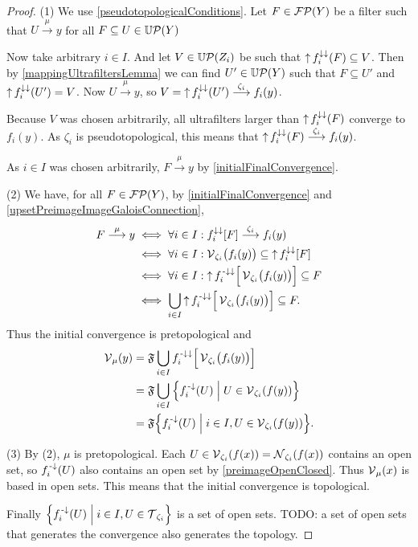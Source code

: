 \begin{proof}
(1) We use \ref{pseudotopologicalConditions}. Let $F\in\operatorname{\mathcal{FP}}(Y)$ be a filter such that $U\overset{\mu}{\longrightarrow} y$ for all $F\subseteq U\in\operatorname{\mathbb{U}\mathcal{P}}(Y)$ 

Now take arbitrary $i\in I$. And let $V\in\operatorname{\mathbb{U}\mathcal{P}}(Z_i)$ be such that $\operatorname{\uparrow} f_i^{\downarrow\downarrow}(F) \subseteq V$. Then by \ref{mappingUltrafiltersLemma} we can find $U'\in\operatorname{\mathbb{U}\mathcal{P}}(Y)$ such that $F\subseteq U'$ and $\operatorname{\uparrow} f_i^{\downarrow\downarrow}(U') = V$. Now $U\overset{\mu}{\longrightarrow} y$, so $V = \operatorname{\uparrow} f_i^{\downarrow\downarrow}(U') \overset{\zeta_i}{\longrightarrow} f_i(y)$. 

Because $V$ was chosen arbitrarily, all ultrafilters larger than $\operatorname{\uparrow} f_i^{\downarrow\downarrow}(F)$ converge to $f_i(y)$. As $\zeta_i$ is pseudotopological, this means that $\operatorname{\uparrow} f_i^{\downarrow\downarrow}(F) \overset{\zeta_i}{\longrightarrow} f_i(y)$.

As $i\in I$ was chosen arbitrarily, $F\overset{\mu}{\longrightarrow} y$ by \ref{initialFinalConvergence}.

(2) We have, for all $F\in \operatorname{\mathcal{FP}}(Y)$, by \ref{initialFinalConvergence} and \ref{upsetPreimageImageGaloisConnection},
\begin{align*}
F \overset{\mu}{\longrightarrow} y &\iff \forall i\in I: f_i^{\downarrow\downarrow}[F] \overset{\zeta_i}{\longrightarrow} f_i(y) \\
&\iff \forall i\in I: \operatorname{\mathcal{V}}_{\zeta_i}\!\big(f_i(y)\big) \subseteq \operatorname{\uparrow} f_i^{\downarrow\downarrow}[F] \\
&\iff \forall i\in I: \operatorname{\uparrow} f_i^{{\text{\hspace{0.15em}-}\downarrow}\downarrow}\Big[\operatorname{\mathcal{V}}_{\zeta_i}\!\big(f_i(y)\big)\Big] \subseteq F \\
&\iff \bigcup_{i\in I} \operatorname{\uparrow} f_i^{{\text{\hspace{0.15em}-}\downarrow}\downarrow}\Big[\operatorname{\mathcal{V}}_{\zeta_i}\!\big(f_i(y)\big)\Big] \subseteq F.
\end{align*}
Thus the initial convergence is pretopological and
\begin{align*}
\vicinities_\mu(y) &= \mathfrak{F}\bigcup_{i\in I} f_i^{\preimf\imf}\Big[\vicinities_{\zeta_i}\!\big(f_i(y)\big)\Big] \\
&= \mathfrak{F}\bigcup_{i\in I}\setbuilder{f_i^\preimf(U)}{U\in \vicinities_{\zeta_i}(f(y))} \\
&= \mathfrak{F}\setbuilder{f_i^\preimf(U)}{i\in I, U\in \vicinities_{\zeta_i}(f(y))}.
\end{align*}

(3) By (2), $\mu$ is pretopological. Each $U\in \operatorname{\mathcal{V}}_{\zeta_i}(f(x)) = \operatorname{\mathcal{N}}_{\zeta_i}(f(x))$ contains an open set, so $f_i^{\text{\hspace{0.15em}-}\downarrow}(U)$ also contains an open set by \ref{preimageOpenClosed}. Thus $\operatorname{\mathcal{V}}_\mu(x)$ is based in open sets. This means that the initial convergence is topological.

Finally $\setbuilder{f_i^\preimf(U)}{i\in I, U\in \topology_{\zeta_i}}$ is a set of open sets. TODO: a set of open sets that generates the convergence also generates the topology.
\end{proof}


